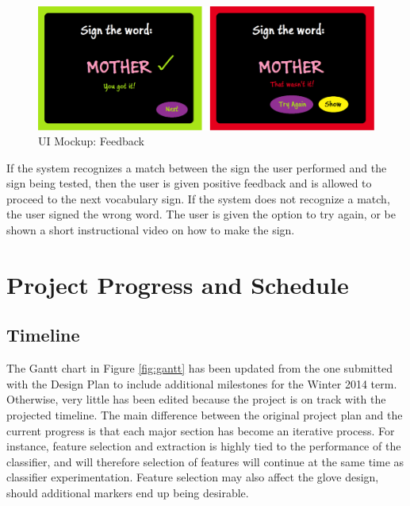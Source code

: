 \documentclass[12pt]{article}
\begin{document}
\begin{figure}[H]
  \centering
  \includegraphics[scale=1]{Mother2.png}
  \caption{UI Mockup: Feedback}
  \label{fig:ui2}
\end{figure}

If the system recognizes a match between the sign the user performed and the sign being tested, then the user is given positive feedback and is allowed to proceed to the next vocabulary sign. If the system does not recognize a match, the user signed the wrong word. The user is given the option to try again, or be shown a short instructional video on how to make the sign. 

\newpage
\section{Project Progress and Schedule}
\subsection{Timeline}
The Gantt chart in Figure \ref{fig:gantt} has been updated from the one submitted with the Design Plan to include additional milestones for the Winter 2014 term. Otherwise, very little has been edited because the project is on track with the projected timeline. The main difference between the original project plan and the current progress is that each major section has become an iterative process. For instance, feature selection and extraction is highly tied to the performance of the classifier, and will therefore selection of features will continue at the same time as classifier experimentation. Feature selection may also affect the glove design, should additional markers end up being desirable. 
\end{document}
